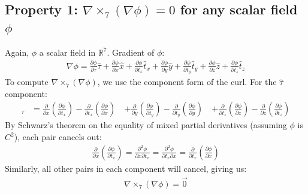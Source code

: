 \documentclass{article}
\begin{document}
\subsection{Property 1: $\nabla \times_7 (\nabla \phi) = 0$ for any scalar field $\phi$}
Again, $\phi$ a scalar field in $\mathbb{R}^7$. Gradient of $\phi$:
\begin{align*}
\nabla \phi = \frac{\partial \phi}{\partial \tau}\hat{\tau} + \frac{\partial \phi}{\partial x}\hat{x} + \frac{\partial \phi}{\partial t_x}\hat{t}_x + \frac{\partial \phi}{\partial y}\hat{y} + \frac{\partial \phi}{\partial t_y}\hat{t}_y + \frac{\partial \phi}{\partial z}\hat{z} + \frac{\partial \phi}{\partial t_z}\hat{t}_z
\end{align*}
To compute $\nabla \times_7 (\nabla \phi)$, we use the component form of the curl. For the $\hat{\tau}$ component:
\begin{align*}
[\nabla \times_7 (\nabla \phi)]_\tau &= \frac{\partial}{\partial x}\left(\frac{\partial \phi}{\partial t_x}\right) - \frac{\partial}{\partial t_x}\left(\frac{\partial \phi}{\partial x}\right) \
&+ \frac{\partial}{\partial y}\left(\frac{\partial \phi}{\partial t_y}\right) - \frac{\partial}{\partial t_y}\left(\frac{\partial \phi}{\partial y}\right) \
&+ \frac{\partial}{\partial t_z}\left(\frac{\partial \phi}{\partial z}\right) - \frac{\partial}{\partial z}\left(\frac{\partial \phi}{\partial t_z}\right)
\end{align*}
By Schwarz's theorem on the equality of mixed partial derivatives (assuming $\phi$ is $C^2$), each pair cancels out:
\begin{align*}
\frac{\partial}{\partial x}\left(\frac{\partial \phi}{\partial t_x}\right) = \frac{\partial^2 \phi}{\partial x \partial t_x} = \frac{\partial^2 \phi}{\partial t_x \partial x} = \frac{\partial}{\partial t_x}\left(\frac{\partial \phi}{\partial x}\right)
\end{align*}
Similarly, all other pairs in each component will cancel, giving us:
\begin{align*}
\nabla \times_7 (\nabla \phi) = \vec{0}
\end{align*}
\end{document}
